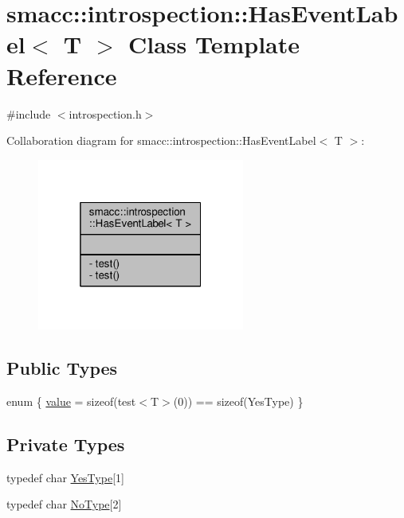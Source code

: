 \hypertarget{classsmacc_1_1introspection_1_1HasEventLabel}{}\section{smacc\+:\+:introspection\+:\+:Has\+Event\+Label$<$ T $>$ Class Template Reference}
\label{classsmacc_1_1introspection_1_1HasEventLabel}


{\ttfamily \#include $<$introspection.\+h$>$}



Collaboration diagram for smacc\+:\+:introspection\+:\+:Has\+Event\+Label$<$ T $>$\+:\nopagebreak
\begin{figure}[H]
\begin{center}
\leavevmode
\includegraphics[width=193pt]{classsmacc_1_1introspection_1_1HasEventLabel__coll__graph}
\end{center}
\end{figure}
\subsection*{Public Types}
\begin{DoxyCompactItemize}
\item 
enum \{ \hyperlink{classsmacc_1_1introspection_1_1HasEventLabel_a2de6073f80d42739c5ed78d301bd853ba3f57db3ac5b424aedec54eb89e48b732}{value} = sizeof(test$<$T$>$(0)) == sizeof(Yes\+Type)
 \}
\end{DoxyCompactItemize}
\subsection*{Private Types}
\begin{DoxyCompactItemize}
\item 
typedef char \hyperlink{classsmacc_1_1introspection_1_1HasEventLabel_a8d4b4c2ecb640812e11e8c1407636b6a}{Yes\+Type}\mbox{[}1\mbox{]}
\item 
typedef char \hyperlink{classsmacc_1_1introspection_1_1HasEventLabel_a91b6dd8a7c59c7f24ef0937c99026e81}{No\+Type}\mbox{[}2\mbox{]}
\end{DoxyCompactItemize}
